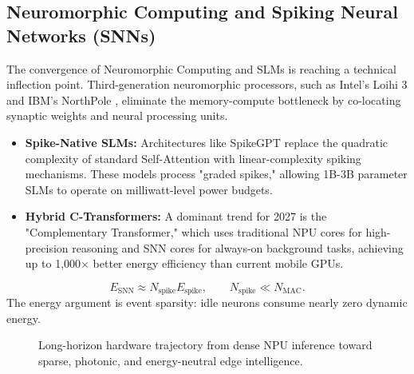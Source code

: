 \documentclass[twocolumn,10pt]{article}
\begin{document}
\subsection{Neuromorphic Computing and Spiking Neural Networks (SNNs)}
The convergence of Neuromorphic Computing and SLMs is reaching a technical inflection point. Third-generation neuromorphic processors, such as Intel's Loihi 3 \cite{loihi3_2026} and IBM's NorthPole \cite{northpole2026}, eliminate the memory-compute bottleneck by co-locating synaptic weights and neural processing units. 
\begin{itemize}
    \item \textbf{Spike-Native SLMs:} Architectures like SpikeGPT \cite{spikegpt2025} replace the quadratic complexity of standard Self-Attention with linear-complexity spiking mechanisms. These models process "graded spikes," allowing 1B-3B parameter SLMs to operate on milliwatt-level power budgets.
    \item \textbf{Hybrid C-Transformers:} A dominant trend for 2027 is the "Complementary Transformer," which uses traditional NPU cores for high-precision reasoning and SNN cores for always-on background tasks, achieving up to 1,000$\times$ better energy efficiency than current mobile GPUs.
\end{itemize}
\begin{equation}
E_{\mathrm{SNN}}\approx N_{\mathrm{spike}}E_{\mathrm{spike}},
\qquad
N_{\mathrm{spike}}\ll N_{\mathrm{MAC}}.
\label{eq:snn_energy}
\end{equation}
The energy argument is event sparsity: idle neurons consume nearly zero dynamic energy.

\begin{figure}[t]
\centering
{}
\caption{Long-horizon hardware trajectory from dense NPU inference toward sparse, photonic, and energy-neutral edge intelligence.}
\label{fig:future_map}
\end{figure}
\end{document}
